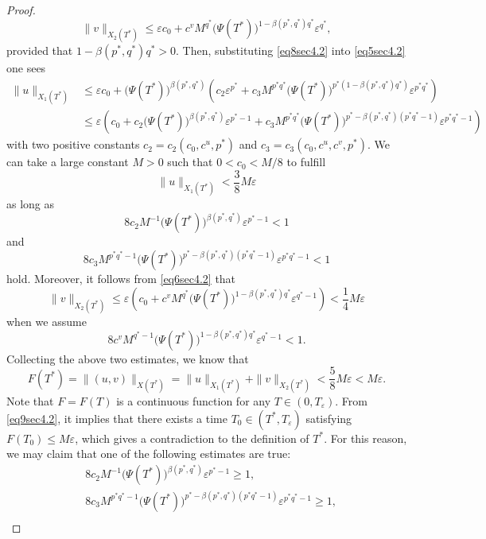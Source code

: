 \documentclass[11pt,reqno]{amsart}
\numberwithin{equation}{section}
\theoremstyle{plain}
\begin{document}
\begin{proof}
\begin{equation}\label{eq8sec4.2}
\|v\|_{X_2\left(T^*\right)} \leq \varepsilon c_0+c^v M^{q^*}\big(\Psi(T^*)\big)^{1-\beta(p^*,q^*)q^*} \varepsilon^{q^*},
\end{equation}
provided that $1-\beta(p^*,q^*)q^*>0$. Then, substituting \eqref{eq8sec4.2} into \eqref{eq5sec4.2} one sees
$$
\begin{aligned}
\|u\|_{X_1\left(T^*\right)} & \leq \varepsilon c_0+\big(\Psi(T^*)\big)^{\beta(p^*,q^*)}\left(c_2 \varepsilon^{p^*}+c_3 M^{p^*q^*}\big(\Psi(T^*)\big)^{p^*(1-\beta(p^*,q^*)q^*)} \varepsilon^{p^*q^*}\right) \\
& \leq \varepsilon\left(c_0+c_2\big(\Psi(T^*)\big)^{\beta(p^*,q^*)} \varepsilon^{p^*-1}+c_3 M^{p^*q^*}\big(\Psi(T^*)\big)^{p^*-\beta(p^*,q^*)(p^*q^*-1)} \varepsilon^{p^*q^*-1}\right)
\end{aligned}
$$
with two positive constants $c_2=c_2\left(c_0,c^u, p^*\right)$ and $c_3=c_3\left(c_0,c^u, c^v, p^*\right)$. We can take a large constant $M>0$ such that $0<c_0<M /8$ to fulfill
$$
\|u\|_{X_1\left(T^*\right)}<\frac{3}{8} M \varepsilon
$$
as long as
$$
8 c_2 M^{-1}\big(\Psi(T^*)\big)^{\beta(p^*,q^*)}\varepsilon^{p^*-1}<1 $$
and
$$ 8 c_3 M^{p^*q^*-1}\big(\Psi(T^*)\big)^{p^*-\beta(p^*,q^*)(p^*q^*-1)} \varepsilon^{p^*q^*-1}<1
$$
hold. Moreover, it follows from \eqref{eq6sec4.2} that
$$
\|v\|_{X_2\left(T^*\right)} \leq \varepsilon\left(c_0+c^v M^{q^*}\big(\Psi(T^*)\big)^{1-\beta(p^*,q^*)q^*}\varepsilon^{q^*-1}\right)<\frac{1}{4} M \varepsilon
$$
when we assume
$$
8 c^v M^{q^*-1}\big(\Psi(T^*)\big)^{1-\beta(p^*,q^*)q^*} \varepsilon^{q^*-1}<1 .
$$
Collecting the above two estimates, we know that
\begin{equation}\label{eq9sec4.2}
F\left(T^*\right)=\|(u, v)\|_{X\left(T^*\right)}=\|u\|_{X_1\left(T^*\right)}+\|v\|_{X_2\left(T^*\right)}<\frac{5}{8} M \varepsilon<M \varepsilon .
\end{equation}
Note that $F=F(T)$ is a continuous function for any $T \in\left(0, T_{\varepsilon}\right)$. From \eqref{eq9sec4.2}, it implies that there exists a time $T_0 \in\left(T^*, T_{\varepsilon}\right)$ satisfying $F\left(T_0\right) \leq M \varepsilon$, which gives a contradiction to the definition of $T^*$. For this reason, we may claim that one of the following estimates are true:
$$
\begin{aligned}
& 8 c_2 M^{-1}\big(\Psi(T^*)\big)^{\beta(p^*,q^*)} \varepsilon^{p^*-1} \geq 1, \\
& 8 c_3 M^{p^*q^*-1}\big(\Psi(T^*)\big)^{p^*-\beta(p^*,q^*)(p^*q^*-1)} \varepsilon^{p^*q^*-1} \geq 1, \\

\end{aligned}$$
\end{proof}
\end{document}
